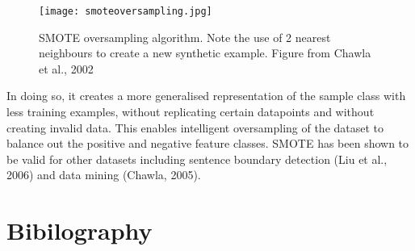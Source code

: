 \documentclass{article}
\begin{document}
\begin{figure}[H]
\texttt{[image: smoteoversampling.jpg]}
\caption{SMOTE oversampling algorithm. Note the use of 2 nearest neighbours to create a new synthetic example. Figure from Chawla et al., 2002}
\centering
\end{figure}

In doing so, it creates a more generalised representation of the sample class with less training examples, without replicating certain datapoints and without creating invalid data. This enables intelligent oversampling of the dataset to balance out the positive and negative feature classes. SMOTE has been shown to be valid for other datasets including sentence boundary detection (Liu et al., 2006) and data mining (Chawla, 2005).
\newpage
\section{Bibilography}
\end{document}
